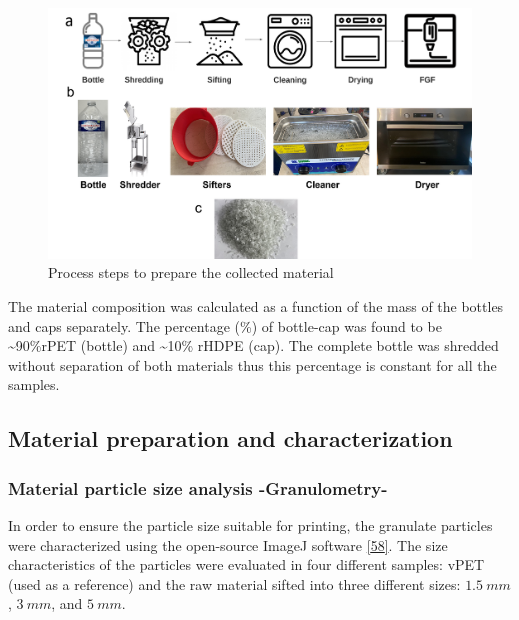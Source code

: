 \documentclass[
]{article}
\begin{document}
\begin{figure}

{\centering \includegraphics{figures/Fig_2.png}

}

\caption{\label{fig-fig1}Process steps to prepare the collected
material}

\end{figure}

The material composition was calculated as a function of the mass of the
bottles and caps separately. The percentage (\%) of bottle-cap was found
to be \textasciitilde90\%rPET (bottle) and \textasciitilde10\% rHDPE
(cap). The complete bottle was shredded without separation of both
materials thus this percentage is constant for all the samples.

\hypertarget{material-preparation-and-characterization}{%
\subsection{Material preparation and
characterization}\label{material-preparation-and-characterization}}

\hypertarget{material-particle-size-analysis--granulometry-}{%
\subsubsection{Material particle size analysis
-Granulometry-}\label{material-particle-size-analysis--granulometry-}}

In order to ensure the particle size suitable for printing, the
granulate particles were characterized using the open-source ImageJ
software \protect\hyperlink{ref-imagej2023}{{[}58{]}}. The size
characteristics of the particles were evaluated in four different
samples: vPET (used as a reference) and the raw material sifted into
three different sizes: \(1.5~mm\), \(3~mm\), and \(5~mm\).
\end{document}
